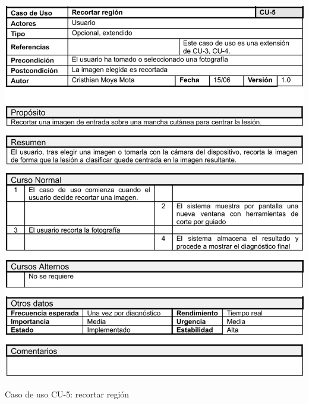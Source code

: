   \begin{table}[H]
	\centering
	\includegraphics[scale=0.85]{imagenes/cu-5.png}
	\caption{Caso de uso CU-5: recortar región}
	\label{fig:cu5}
\end{table}

